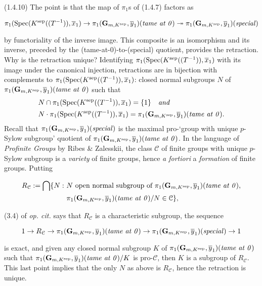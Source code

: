 \documentclass[deligne.tex]{subfiles}
\begin{document}
(1.4.10) The point is that the map of $\pi_1$s of (1.4.7) factors as
\begin{ceqn}\begin{equation*}
	\pi_1(\operatorname{Spec}(K^{\mathrm{sep}}((T^{-1})),\overline x_1)\rightarrow
	\pi_1(\mathbf{G}_{m,K^{\mathrm{sep}}},\overline y_1)(\text{\emph{tame at 0}})
	\twoheadrightarrow
	\pi_1(\mathbf{G}_{m,K^{\mathrm{sep}}},\overline y_1)(\text{\emph{special}})
\end{equation*}\end{ceqn}
by functoriality of the inverse image. This composite is an isomorphism
and its inverse, preceded by the (tame-at-0)-to-(special) quotient, 
provides the retraction. Why is the retraction unique?
Identifying $\pi_1(\operatorname{Spec}(K^{\mathrm{sep}}((T^{-1})),\overline x_1)$ with
its image under the canonical injection, retractions are in bijection with 
complements to $\pi_1(\operatorname{Spec}(K^{\mathrm{sep}}((T^{-1})),\overline x_1)$:
closed normal subgroups $N$ of
$\pi_1(\mathbf{G}_{m,K^{\mathrm{sep}}},\overline y_1)(\text{\emph{tame at 0}})$
such that
\begin{align*}
	&N\cap\pi_1(\operatorname{Spec}(K^{\mathrm{sep}}((T^{-1})),\overline x_1)=\{1\}
	\quad\text{\emph{and}} \\
	&N\cdot\pi_1(\operatorname{Spec}(K^{\mathrm{sep}}((T^{-1})),\overline x_1)= \pi_1(\mathbf{G}_{m,K^{\mathrm{sep}}},\overline y_1)(\text{\emph{tame at 0}}).
\end{align*}
Recall that
$\pi_1(\mathbf{G}_{m,K^{\mathrm{sep}}},\overline y_1)(\text{\emph{special}})$
is the maximal pro-`group with unique $p$-Sylow subgroup' quotient of
$\pi_1(\mathbf{G}_{m,K^{\mathrm{sep}}},\overline y_1)(\text{\emph{tame at 0}})$.
In the language of \emph{Profinite Groups} by Ribes \& Zalesskii, the class
$\mathcal C$ of finite groups with unique $p$-Sylow subgroup is
a \emph{variety} of finite groups, hence \emph{a fortiori} a 
\emph{formation} of finite groups. Putting
\begin{ceqn}\begin{align*}
	R_{\mathcal C}:=\bigcap\{N:\ &N\text{ open normal subgroup of }
	\pi_1(\mathbf{G}_{m,K^{\mathrm{sep}}},\overline y_1)(\text{\emph{tame at 0}}),
	\\
	&\pi_1(\mathbf{G}_{m,K^{\mathrm{sep}}},\overline y_1)(\text{\emph{tame at 0}})/N\in\mathcal C\},
\end{align*}\end{ceqn}
(3.4) of \emph{op. cit.} says that $R_{\mathcal C}$ is a characteristic subgroup, the sequence
\begin{ceqn}\begin{equation*}
	1\rightarrow R_{\mathcal C}\rightarrow
	\pi_1(\mathbf{G}_{m,K^{\mathrm{sep}}},\overline y_1)(\text{\emph{tame at 0}})\rightarrow
	\pi_1(\mathbf{G}_{m,K^{\mathrm{sep}}},\overline y_1)(\text{\emph{special}})\rightarrow1
\end{equation*}\end{ceqn}
is exact, and given any closed normal subgroup $K$ of
$\pi_1(\mathbf{G}_{m,K^{\mathrm{sep}}},\overline y_1)(\text{\emph{tame at 0}})$
such that
$\pi_1(\mathbf{G}_{m,K^{\mathrm{sep}}},\overline y_1)(\text{\emph{tame at 0}})/K$
is pro-$\mathcal C$, then $K$ is a subgroup of $R_{\mathcal C}$.
This last point implies that the only $N$ as above is $R_{\mathcal C}$,
hence the retraction is unique.
\end{document}
